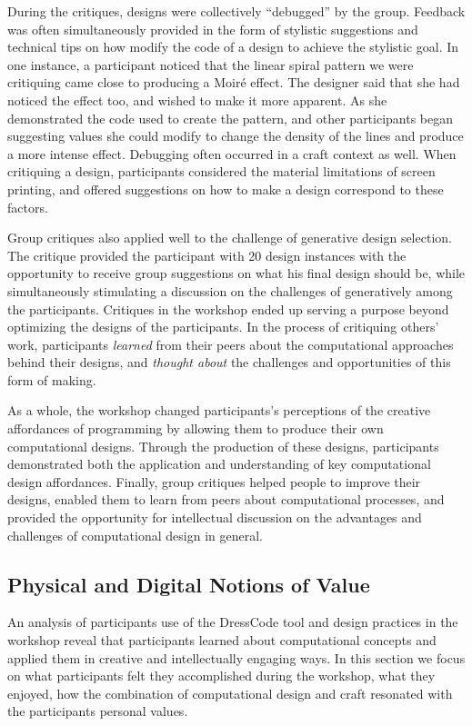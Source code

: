 \documentclass{sigchi}
\begin{document}
During the critiques, designs were collectively ``debugged'' by the group. Feedback was often simultaneously provided in the form of stylistic suggestions and technical tips on how modify the code of a design to achieve the stylistic goal. In one instance, a participant noticed that the linear spiral pattern we were critiquing came close to producing a Moiré effect. The designer said that she had noticed the effect too, and wished to make it more apparent. As she demonstrated the code used to  create the pattern, and other participants began suggesting values she could modify to change the density of the lines and produce a more intense effect. Debugging often occurred in a craft context as well. When critiquing a design, participants considered the material limitations of screen printing, and offered suggestions on how to make a design correspond to these factors.

Group critiques also applied well to the challenge of generative design selection. The critique provided the participant with 20 design instances with the opportunity to receive group suggestions on what his final design should be, while simultaneously stimulating a discussion on the challenges of generatively among the participants. Critiques in the workshop ended up serving a purpose beyond optimizing the designs of the participants. In the process of critiquing others' work, participants \emph{learned} from their peers about the computational approaches behind their designs, and \emph{thought about} the challenges and opportunities of this form of making.

As a whole, the workshop changed participants's perceptions of the creative affordances of programming by allowing them to produce their own computational designs. Through the production of these designs, participants demonstrated both the application and understanding of key computational design affordances. Finally, group critiques helped people to improve their designs, enabled them to learn from peers about computational processes, and provided the opportunity for intellectual discussion on the advantages and challenges of computational design in general.

\subsection{Physical and Digital Notions of Value}
An analysis of participants use of the DressCode tool and design practices in the workshop reveal that participants learned about computational concepts and applied them in creative and intellectually engaging ways. In this section we focus on what participants felt they accomplished during the workshop, what they enjoyed, how the combination of computational design and craft resonated with the participants personal values. 
\end{document}
